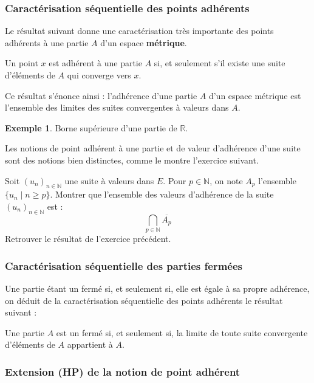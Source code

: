 \documentclass[french]{article}
\newcommand{\N}{\mathbb{N}}
\newcommand{\R}{\mathbb{R}}
\theoremstyle{plain}
\theoremstyle{definition}
\newtheorem*{ex}{Exemple}
\theoremstyle{remark}
\begin{document}
\subsubsection*{Caractérisation séquentielle des points adhérents}

Le résultat suivant donne une caractérisation très importante des points adhérents à une partie $A$ d'un espace \textbf{métrique}.

\begin{prop}
	Un point $x$ est adhérent à une partie $A$ si, et seulement s'il existe une suite d'éléments de $A$ qui converge vers $x$.
\end{prop}

Ce résultat s'énonce ainsi : l'adhérence d'une partie $A$ d'un espace métrique est l'ensemble des limites des suites convergentes à valeurs dans $A$.

\begin{ex}
	Borne supérieure d'une partie de $\R$.
\end{ex}

Les notions de point adhérent à une partie et de valeur d'adhérence d'une suite sont des notions bien distinctes, comme le montre l'exercice suivant.

\begin{exo}
	Soit $(u_n)_{n\in\N}$ une suite à valeurs dans $E$. Pour $p\in\N$, on note $A_p$ l'ensemble $\{u_n\mid n\geqslant p\}$. Montrer que l'ensemble des valeurs d'adhérence de la suite $(u_n)_{n\in\N}$ est :
	$$\bigcap_{p\in\N}\overline{A_p}$$ Retrouver le résultat de l'exercice précédent.
\end{exo}

\subsubsection*{Caractérisation séquentielle des parties fermées}

Une partie étant un fermé si, et seulement si, elle est égale à sa propre adhérence, on déduit de la caractérisation séquentielle des points adhérents le résultat suivant :

\begin{prop}
	Une partie $A$ est un fermé si, et seulement si, la limite de toute suite convergente d'éléments de $A$ appartient à $A$.
\end{prop}

\subsubsection*{Extension (HP) de la notion de point adhérent}
\end{document}
